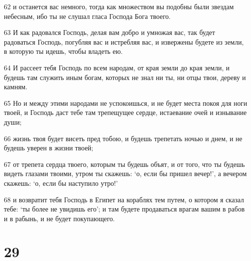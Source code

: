 \par 62 и останется вас немного, тогда как множеством вы подобны были звездам небесным, ибо ты не слушал гласа Господа Бога твоего.
\par 63 И как радовался Господь, делая вам добро и умножая вас, так будет радоваться Господь, погубляя вас и истребляя вас, и извержены будете из земли, в которую ты идешь, чтобы владеть ею.
\par 64 И рассеет тебя Господь по всем народам, от края земли до края земли, и будешь там служить иным богам, которых не знал ни ты, ни отцы твои, дереву и камням.
\par 65 Но и между этими народами не успокоишься, и не будет места покоя для ноги твоей, и Господь даст тебе там трепещущее сердце, истаевание очей и изнывание души;
\par 66 жизнь твоя будет висеть пред тобою, и будешь трепетать ночью и днем, и не будешь уверен в жизни твоей;
\par 67 от трепета сердца твоего, которым ты будешь объят, и от того, что ты будешь видеть глазами твоими, утром ты скажешь: `о, если бы пришел вечер!', а вечером скажешь: `о, если бы наступило утро!'
\par 68 и возвратит тебя Господь в Египет на кораблях тем путем, о котором я сказал тебе: `ты более не увидишь его'; и там будете продаваться врагам вашим в рабов и в рабынь, и не будет покупающего.

\chapter{29}

